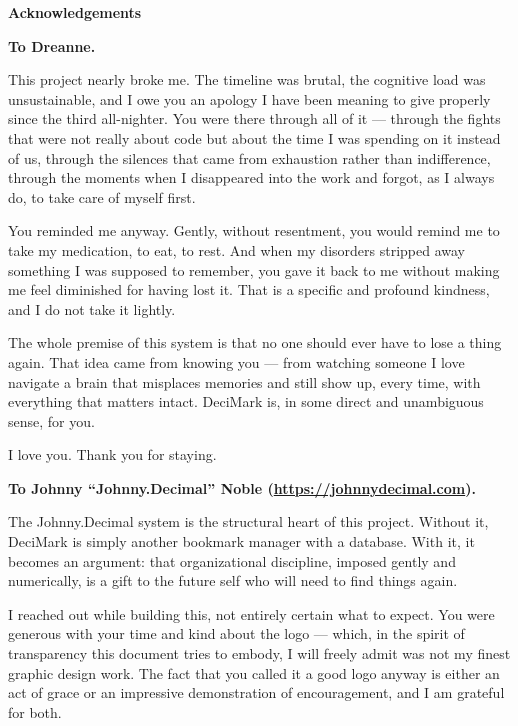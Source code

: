 \documentclass[11pt,a4paper]{book}
\begin{document}
\clearpage
\cleardoublepage

\thispagestyle{empty}
\begin{center}
  {\Large\bfseries Acknowledgements\\[1em]}
\end{center}

\vspace{0.5em}

\textbf{To Dreanne.}

This project nearly broke me. The timeline was brutal, the cognitive load was unsustainable, and I owe you an apology I have been meaning to give properly since the third all-nighter. You were there through all of it --- through the fights that were not really about code but about the time I was spending on it instead of us, through the silences that came from exhaustion rather than indifference, through the moments when I disappeared into the work and forgot, as I always do, to take care of myself first.

You reminded me anyway. Gently, without resentment, you would remind me to take my medication, to eat, to rest. And when my disorders stripped away something I was supposed to remember, you gave it back to me without making me feel diminished for having lost it. That is a specific and profound kindness, and I do not take it lightly.

The whole premise of this system is that no one should ever have to lose a thing again. That idea came from knowing you --- from watching someone I love navigate a brain that misplaces memories and still show up, every time, with everything that matters intact. DeciMark is, in some direct and unambiguous sense, for you.

I love you. Thank you for staying.

\vspace{2em}

\textbf{To Johnny ``Johnny.Decimal'' Noble (\url{https://johnnydecimal.com}).}

The Johnny.Decimal system is the structural heart of this project. Without it, DeciMark is simply another bookmark manager with a database. With it, it becomes an argument: that organizational discipline, imposed gently and numerically, is a gift to the future self who will need to find things again.

I reached out while building this, not entirely certain what to expect. You were generous with your time and kind about the logo --- which, in the spirit of transparency this document tries to embody, I will freely admit was not my finest graphic design work. The fact that you called it a good logo anyway is either an act of grace or an impressive demonstration of encouragement, and I am grateful for both.
\end{document}
